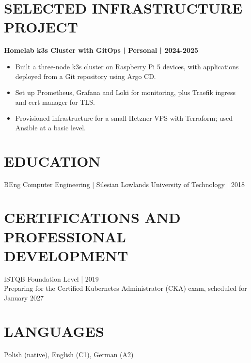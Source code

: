 \documentclass[11pt,a4paper]{article}
\begin{document}
\section*{SELECTED INFRASTRUCTURE PROJECT}
\textbf{Homelab k3s Cluster with GitOps | Personal | 2024-2025}
\begin{itemize}[label=-]
\item Built a three-node k3s cluster on Raspberry Pi 5 devices, with applications deployed from a Git repository using Argo CD.
\item Set up Prometheus, Grafana and Loki for monitoring, plus Traefik ingress and cert-manager for TLS.
\item Provisioned infrastructure for a small Hetzner VPS with Terraform; used Ansible at a basic level.
\end{itemize}

\section*{EDUCATION}
BEng Computer Engineering | Silesian Lowlands University of Technology | 2018

\section*{CERTIFICATIONS AND PROFESSIONAL DEVELOPMENT}
ISTQB Foundation Level | 2019\\
Preparing for the Certified Kubernetes Administrator (CKA) exam, scheduled for January 2027

\section*{LANGUAGES}
Polish (native), English (C1), German (A2)
\end{document}
